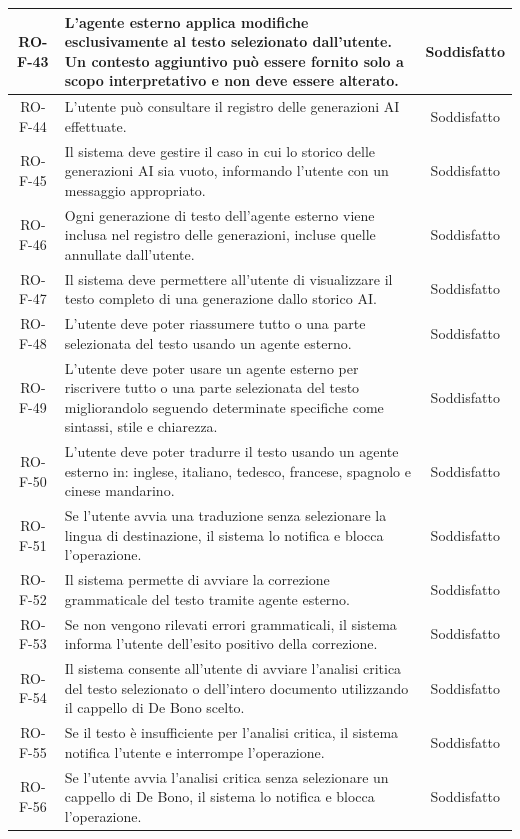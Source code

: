 \documentclass[11pt,a4paper]{article}
\begin{document}
\begin{longtable}{|c|p{11cm}|c|}
\hline
RO-F-43 & L'agente esterno applica modifiche esclusivamente al testo selezionato dall'utente. Un contesto aggiuntivo può essere fornito solo a scopo interpretativo e non deve essere alterato. & Soddisfatto \\
\hline
RO-F-44 & L'utente può consultare il registro delle generazioni AI effettuate. & Soddisfatto \\
\hline
RO-F-45 & Il sistema deve gestire il caso in cui lo storico delle generazioni AI sia vuoto, informando l'utente con un messaggio appropriato. & Soddisfatto \\
\hline
RO-F-46 & Ogni generazione di testo dell'agente esterno viene inclusa nel registro delle generazioni, incluse quelle annullate dall'utente. & Soddisfatto \\
\hline
RO-F-47 & Il sistema deve permettere all'utente di visualizzare il testo completo di una generazione dallo storico AI. & Soddisfatto \\
\hline
RO-F-48 & L'utente deve poter riassumere tutto o una parte selezionata del testo usando un agente esterno. & Soddisfatto \\
\hline
RO-F-49 & L'utente deve poter usare un agente esterno per riscrivere tutto o una parte selezionata del testo migliorandolo seguendo determinate specifiche come sintassi, stile e chiarezza. & Soddisfatto \\
\hline
RO-F-50 & L'utente deve poter tradurre il testo usando un agente esterno in: inglese, italiano, tedesco, francese, spagnolo e cinese mandarino. & Soddisfatto \\
\hline
RO-F-51 & Se l'utente avvia una traduzione senza selezionare la lingua di destinazione, il sistema lo notifica e blocca l'operazione. & Soddisfatto \\
\hline
RO-F-52 & Il sistema permette di avviare la correzione grammaticale del testo tramite agente esterno. & Soddisfatto \\
\hline
RO-F-53 & Se non vengono rilevati errori grammaticali, il sistema informa l'utente dell'esito positivo della correzione. & Soddisfatto \\
\hline
RO-F-54 & Il sistema consente all'utente di avviare l'analisi critica del testo selezionato o dell'intero documento utilizzando il cappello di De Bono scelto. & Soddisfatto \\
\hline
RO-F-55 & Se il testo è insufficiente per l'analisi critica, il sistema notifica l'utente e interrompe l'operazione. & Soddisfatto \\
\hline
RO-F-56 & Se l'utente avvia l'analisi critica senza selezionare un cappello di De Bono, il sistema lo notifica e blocca l'operazione. & Soddisfatto \\

\end{longtable}
\end{document}

